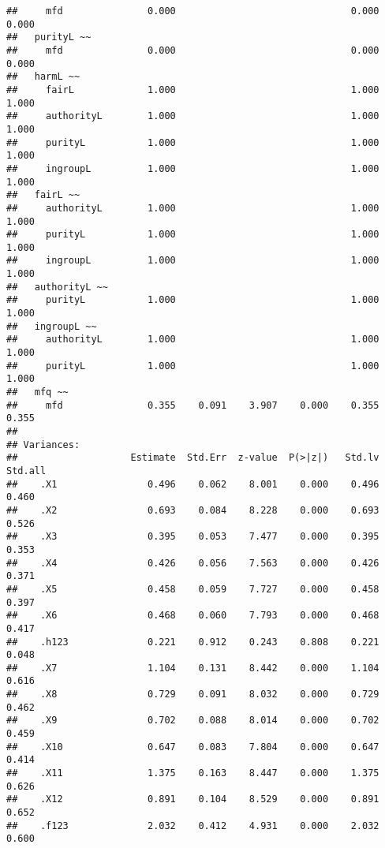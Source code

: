\documentclass[english,man]{apa6}
\newcounter{author}
\theoremstyle{definition}
\theoremstyle{definition}
\theoremstyle{definition}
\theoremstyle{remark}
\begin{document}
\begin{verbatim}
##     mfd               0.000                               0.000    0.000
##   purityL ~~                                                            
##     mfd               0.000                               0.000    0.000
##   harmL ~~                                                              
##     fairL             1.000                               1.000    1.000
##     authorityL        1.000                               1.000    1.000
##     purityL           1.000                               1.000    1.000
##     ingroupL          1.000                               1.000    1.000
##   fairL ~~                                                              
##     authorityL        1.000                               1.000    1.000
##     purityL           1.000                               1.000    1.000
##     ingroupL          1.000                               1.000    1.000
##   authorityL ~~                                                         
##     purityL           1.000                               1.000    1.000
##   ingroupL ~~                                                           
##     authorityL        1.000                               1.000    1.000
##     purityL           1.000                               1.000    1.000
##   mfq ~~                                                                
##     mfd               0.355    0.091    3.907    0.000    0.355    0.355
## 
## Variances:
##                    Estimate  Std.Err  z-value  P(>|z|)   Std.lv  Std.all
##    .X1                0.496    0.062    8.001    0.000    0.496    0.460
##    .X2                0.693    0.084    8.228    0.000    0.693    0.526
##    .X3                0.395    0.053    7.477    0.000    0.395    0.353
##    .X4                0.426    0.056    7.563    0.000    0.426    0.371
##    .X5                0.458    0.059    7.727    0.000    0.458    0.397
##    .X6                0.468    0.060    7.793    0.000    0.468    0.417
##    .h123              0.221    0.912    0.243    0.808    0.221    0.048
##    .X7                1.104    0.131    8.442    0.000    1.104    0.616
##    .X8                0.729    0.091    8.032    0.000    0.729    0.462
##    .X9                0.702    0.088    8.014    0.000    0.702    0.459
##    .X10               0.647    0.083    7.804    0.000    0.647    0.414
##    .X11               1.375    0.163    8.447    0.000    1.375    0.626
##    .X12               0.891    0.104    8.529    0.000    0.891    0.652
##    .f123              2.032    0.412    4.931    0.000    2.032    0.600

\end{verbatim}
\end{document}
